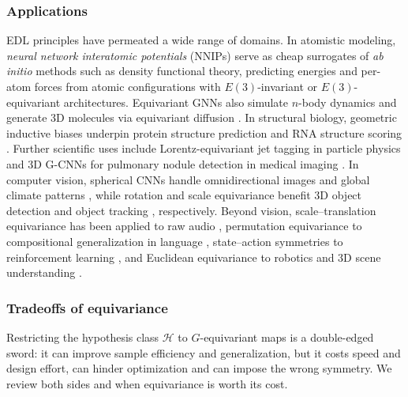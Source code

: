 \documentclass[mathematics,review,submit,moreauthors]{Definitions/mdpi}
\begin{document}
\subsubsection{Applications}
EDL principles have permeated a wide range of domains.
In atomistic modeling, \emph{neural network interatomic potentials} (NNIPs) serve as cheap surrogates of \textit{ab initio} methods such as density functional theory, predicting energies and per-atom forces from atomic configurations with $E(3)$-invariant \citep{schutt2017anips} or $E(3)$-equivariant \citep{batzner2022nc,liao2022,liao2023,passaro2023} architectures.
Equivariant GNNs also simulate $n$-body dynamics \citep{satorras2021p3icml} and generate 3D molecules via equivariant diffusion \citep{cornet2024}.
In structural biology, geometric inductive biases underpin protein structure prediction \citep{jumper2021na,baek2021s} and RNA structure scoring \citep{townshend2021s}.
Further scientific uses include Lorentz-equivariant jet tagging in particle physics \citep{bogatskiy2020p3icml} and 3D G-CNNs for pulmonary nodule detection in medical imaging \citep{winkels2019mia}.
In computer vision, spherical CNNs handle omnidirectional images and global climate patterns \citep{cohen2018,cohen2019p3icml}, while rotation and scale equivariance benefit 3D object detection \citep{yu2022} and object tracking \citep{sosnovik2021}, respectively.
Beyond vision, scale--translation equivariance has been applied to raw audio \citep{romero2023tmlr}, permutation equivariance to compositional generalization in language \citep{gordon2020}, state--action symmetries to reinforcement learning \citep{vanderpol2020anips}, and Euclidean equivariance to robotics and 3D scene understanding \citep{seo2025a,fei2024air}.



\subsubsection{Tradeoffs of equivariance}\label{sec:edl-tradeoffs}
Restricting the hypothesis class $\mathcal{H}$ to $G$-equivariant maps is a double-edged sword: it can improve sample efficiency and generalization, but it costs speed and design effort, can hinder optimization and can impose the wrong symmetry.
We review both sides and when equivariance is worth its cost.
\end{document}
